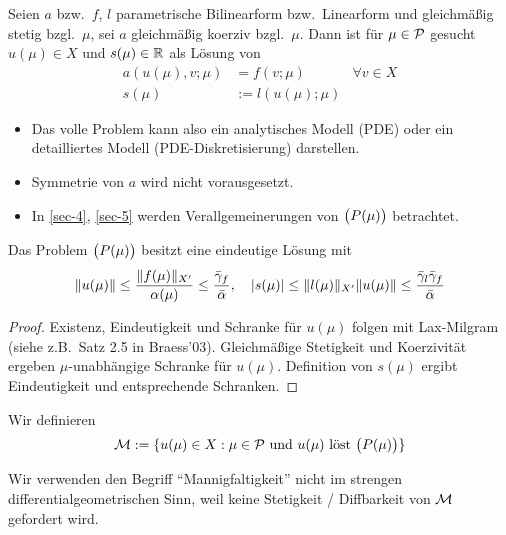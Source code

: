 \begin{defn}
	Seien $a$ bzw.\ $f$, $l$ parametrische Bilinearform bzw.\ Linearform und gleichmäßig stetig bzgl.\ $\mu$, sei $a$ gleichmäßig koerziv bzgl.\ $\mu$.
	Dann ist für $\mu \in \mathcal{P}$ gesucht $u(\mu) \in X$ und $s(\mu) \in \mathbb{R}$ als Lösung von
	\begin{align*}
		a(u(\mu),v;\mu) &= f(v;\mu) &\forall v \in X\\
		s(\mu) &:= l(u(\mu);\mu)
	\end{align*}
\end{defn}

\begin{bem} \beginwithlistbem
	\begin{itemize}
		\item Das volle Problem kann also ein analytisches Modell (PDE) oder ein detailliertes Modell (PDE-Diskretisierung) darstellen.
		\item Symmetrie von $a$ wird nicht vorausgesetzt.
		\item In \cref{sec-4}, \cref{sec-5} werden Verallgemeinerungen von $\big(P(\mu)\big)$ betrachtet.
	\end{itemize}
\end{bem}

\begin{satz}
	Das Problem $\big(P(\mu)\big)$ besitzt eine eindeutige Lösung mit
	\[
		\|u(\mu)\| \leq \frac{\|f(\mu)\|_{X'}}{\alpha(\mu)} \leq \frac{\bar \gamma_f}{\bar \alpha}, \quad |s(\mu)| \leq \|l(\mu)\|_{X'} \|u(\mu)\| \leq \frac{\bar \gamma_l \bar \gamma_f}{\bar\alpha}
	\]

	\begin{proof}
		Existenz, Eindeutigkeit und Schranke für $u(\mu)$ folgen mit Lax-Milgram (siehe z.B.\ Satz 2.5 in Braess'03).
		Gleichmäßige Stetigkeit und Koerzivität ergeben $\mu$-unabhängige Schranke für $u(\mu)$.
		Definition von $s(\mu)$ ergibt Eindeutigkeit und entsprechende Schranken.
	\end{proof}
\end{satz}

\begin{defn}[Lösungsmannigfaltigkeit]
	Wir definieren
	\[
		\mathcal{M} := \{ u(\mu) \in X : \mu \in \mathcal{P} \text{ und } u(\mu) \text{ löst } \big(P(\mu)\big) \}
	\]
\end{defn}

\begin{bem}
	Wir verwenden den Begriff ``Mannigfaltigkeit'' nicht im strengen differentialgeometrischen Sinn, weil keine Stetigkeit / Diffbarkeit von $\mathcal{M}$ gefordert wird.
\end{bem}

